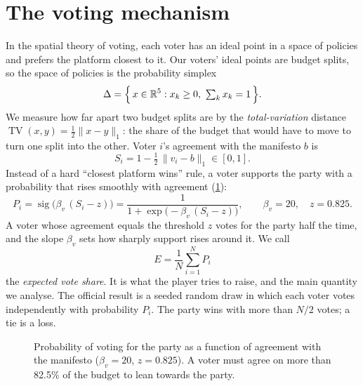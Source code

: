 \documentclass[11pt,a4paper,oneside]{report}
\newcommand{\simplex}{\Delta}
\newcommand{\TV}{\operatorname{TV}}
\newcommand{\sig}{\operatorname{sig}}
\newcommand{\R}{\mathbb{R}}
\begin{document}
\section{The voting mechanism}

In the spatial theory of voting, each voter has an ideal point in a space of
policies and prefers the platform closest to it. Our voters' ideal points are budget splits, so the space
of policies is the probability simplex
\begin{equation}
  \simplex = \Bigl\{\, x \in \R^5 : x_k \ge 0,\ \textstyle\sum_{k} x_k = 1 \,\Bigr\}.
\end{equation}
We measure how far apart two budget splits are by the \emph{total-variation} distance
$\TV(x,y)=\tfrac12\lVert x-y\rVert_1$: the share of the budget that would have to move to turn one split
into the other. Voter $i$'s agreement with the manifesto $b$ is
\begin{equation}
  S_i = 1 - \tfrac12\,\lVert v_i - b \rVert_1 \in [0,1].
\end{equation}
Instead of a hard ``closest platform wins'' rule, a voter supports the party with a probability that rises
smoothly with agreement (\cref{fig:vote}):
\begin{equation}\label{eq:vote}
  P_i = \sig\bigl(\beta_v\,(S_i - z)\bigr) = \frac{1}{1+\exp\bigl(-\beta_v\,(S_i - z)\bigr)},
  \qquad \beta_v = 20,\quad z = 0.825 .
\end{equation}
A voter whose agreement equals the threshold $z$ votes for the party half the time, and the slope $\beta_v$
sets how sharply support rises around it. We call
\begin{equation}
  E = \frac{1}{N}\sum_{i=1}^{N} P_i
\end{equation}
the \emph{expected vote share}. It is what the player tries to raise, and the main quantity we analyse.
The official result is a seeded random draw in which each voter votes independently with probability
$P_i$. The party wins with more than $N/2$ votes; a tie is a loss.

\begin{figure}[t]
\centering
{}
\caption{Probability of voting for the party as a function of agreement with the manifesto
($\beta_v = 20$, $z = 0.825$). A voter must agree on more than 82.5\% of the budget to lean towards the
party.}
\label{fig:vote}
\end{figure}
\end{document}
